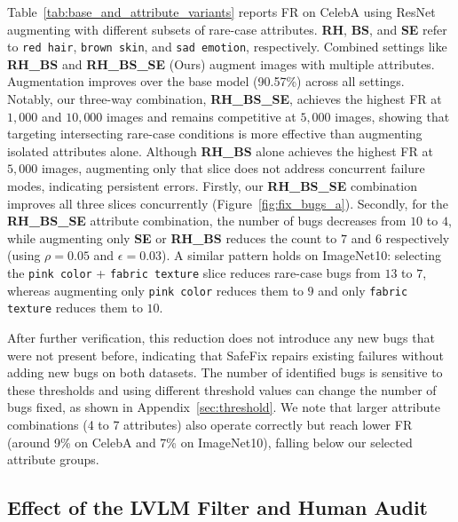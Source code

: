 \documentclass[10pt]{article} %
\begin{document}
Table~\ref{tab:base_and_attribute_variants} reports FR on CelebA using ResNet augmenting with different subsets of rare-case attributes. \textbf{RH}, \textbf{BS}, and \textbf{SE} refer to \texttt{red hair}, \texttt{brown skin}, and \texttt{sad emotion}, respectively. Combined settings like \textbf{RH\_BS} and \textbf{RH\_BS\_SE} (Ours) augment images with multiple attributes. Augmentation improves over the base model (90.57\%) across all settings. Notably, our three-way combination, \textbf{RH\_BS\_SE}, achieves the highest FR at $1,000$ and $10,000$ images and remains competitive at $5,000$ images, showing that targeting intersecting rare-case conditions is more effective than augmenting isolated attributes alone. Although \textbf{RH\_BS} alone achieves the highest FR at $5,000$ images, augmenting only that slice does not address concurrent failure modes, indicating persistent errors. Firstly, our \textbf{RH\_BS\_SE} combination improves all three slices concurrently (Figure~\ref{fig:fix_bugs_a}). Secondly, for the \textbf{RH\_BS\_SE} attribute combination, the number of bugs decreases from $10$ to $4$, while augmenting only \textbf{SE} or \textbf{RH\_BS} reduces the count to $7$ and $6$ respectively (using $\rho=0.05$ and $\epsilon=0.03$). A similar pattern holds on ImageNet10: selecting the \texttt{pink color} + \texttt{fabric texture} slice reduces rare-case bugs from $13$ to $7$, whereas augmenting only \texttt{pink color} reduces them to $9$ and only \texttt{fabric texture} reduces them to $10$.

After further verification, this reduction does not introduce any new bugs that were not present before, indicating that SafeFix repairs existing failures without adding new bugs on both datasets. The number of identified bugs is sensitive to these thresholds and using different threshold values can change the number of bugs fixed, as shown in Appendix~\ref{sec:threshold}. We note that larger attribute combinations (4 to 7 attributes) also operate correctly but reach lower FR (around 9\% on CelebA and 7\% on ImageNet10), falling below our selected attribute groups.


\vspace{10pt}
\subsection{Effect of the LVLM Filter and Human Audit}
\label{sec:human_audit}
\end{document}

